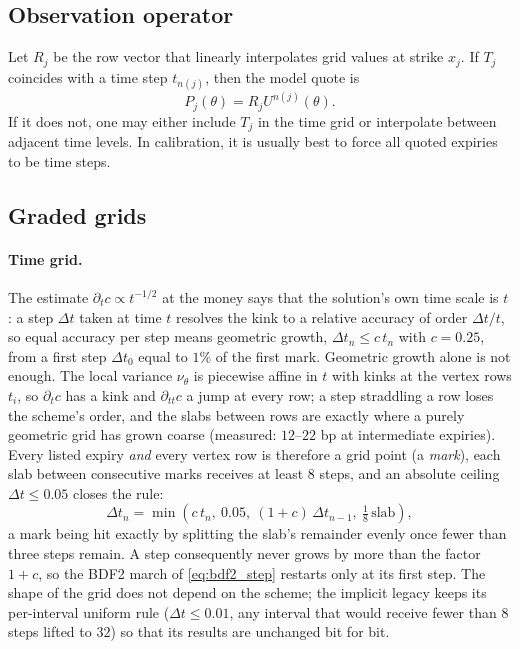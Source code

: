 \documentclass[11pt]{article}
\newcommand{\1}{\mathbf{1}}
\newcommand{\vloc}{\nu}
\begin{document}
\subsection{Observation operator}

Let $R_j$ be the row vector that linearly interpolates grid values at strike $x_j$.
If $T_j$ coincides with a time step $t_{n(j)}$, then the model quote is
\[
  P_j(\theta)=R_jU^{n(j)}(\theta).
\]
If it does not, one may either include $T_j$ in the time grid or interpolate between
adjacent time levels. In calibration, it is usually best to force all quoted expiries to
be time steps.

\subsection{Graded grids}

\paragraph{Time grid.}
The estimate $\partial_tc\propto t^{-1/2}$ at the money says that the solution's own
time scale is $t$: a step $\Delta t$ taken at time $t$ resolves the kink to a relative
accuracy of order $\Delta t/t$, so equal accuracy per step means geometric growth,
$\Delta t_n\le c\,t_n$ with $c=0.25$, from a first step $\Delta t_0$ equal to $1\%$ of the
first mark. Geometric growth alone is not enough. The local variance $\vloc_\theta$ is
piecewise affine in $t$ with kinks at the vertex rows $t_i$, so $\partial_tc$ has a kink
and $\partial_{tt}c$ a jump at every row; a step straddling a row loses the scheme's
order, and the slabs between rows are exactly where a purely geometric grid has grown
coarse (measured: $12$--$22$ bp at intermediate expiries). Every listed expiry
\emph{and} every vertex row is therefore a grid point (a \emph{mark}), each slab between
consecutive marks receives at least $8$ steps, and an absolute ceiling $\Delta t\le0.05$
closes the rule:
\[
  \Delta t_n=\min\!\left(c\,t_n,\ 0.05,\ (1+c)\,\Delta t_{n-1},\ \tfrac18\,\text{slab}\right),
\]
a mark being hit exactly by splitting the slab's remainder evenly once fewer than three
steps remain. A step consequently never grows by more than the factor $1+c$, so the BDF2
march of \eqref{eq:bdf2_step} restarts only at its first step. The shape of the grid does
not depend on the scheme; the implicit legacy keeps its per-interval uniform rule
($\Delta t\le0.01$, any interval that would receive fewer than $8$ steps lifted to $32$)
so that its results are unchanged bit for bit.
\end{document}
